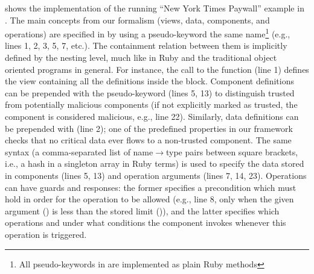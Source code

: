  shows the implementation of the running
``New York Times Paywall'' example in \sLang.  The main concepts from
our formalism (views, data, components, and operations) are specified
in \sLang by using a pseudo-keyword the same name\footnote{All
  pseudo-keywords in \sLang are implemented as plain Ruby methods}
(e.g., lines 1, 2, 3, 5, 7, etc.).  The containment relation between
them is implicitly defined by the nesting level, much like in Ruby and
the traditional object oriented programs in general.  For instance,
the call to the  function (line 1) defines the
 view containing all the definitions inside the
 block.  Component definitions can be prepended with
the  pseudo-keyword (lines 5, 13) to distinguish
trusted from potentially malicious components (if not explicitly
marked as trusted, the component is considered malicious, e.g., line
22).  Similarly, data definitions can be prepended with
 (line 2); one of the predefined properties in our
framework checks that no critical data ever flows to a non-trusted
component.  The same syntax (a comma-separated list of
name$\rightarrow$type pairs between square brackets, i.e., a hash in a
singleton array in Ruby terms) is used to specify the data stored in
components (lines 5, 13) and operation arguments (lines 7, 14, 23).
Operations can have guards and responses: the former specifies a
precondition which must hold in order for the operation to be allowed
(e.g., line 8, only when the given argument () is
less than the stored limit ()), and the latter specifies
which operations and under what conditions the component invokes
whenever this operation is triggered.
